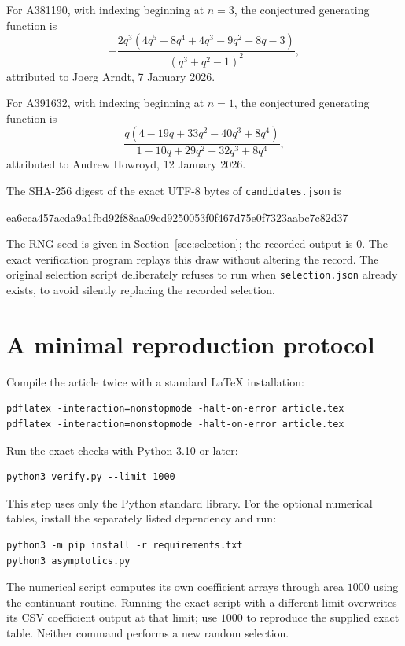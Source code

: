\documentclass[11pt,letterpaper]{article}
\numberwithin{equation}{section}
\theoremstyle{definition}
\begin{document}
For A381190, with indexing beginning at $n=3$, the conjectured generating
function is \cite{oeis381190}
\begin{equation}
 -\frac{2q^3(4q^5+8q^4+4q^3-9q^2-8q-3)}{(q^3+q^2-1)^2},
 \label{eq:candidateDomination}
\end{equation}
attributed to Joerg Arndt, 7 January 2026.

For A391632, with indexing beginning at $n=1$, the conjectured generating
function is \cite{oeis391632}
\begin{equation}
 \frac{q(4-19q+33q^2-40q^3+8q^4)}{1-10q+29q^2-32q^3+8q^4},
 \label{eq:candidateVisibility}
\end{equation}
attributed to Andrew Howroyd, 12 January 2026.

The SHA-256 digest of the exact UTF-8 bytes of \texttt{candidates.json} is
\begin{center}\ttfamily\small
 ea6cca457acda9a1fbd92f88aa09cd9250053f0f467d75e0f7323aabc7c82d37
\end{center}
The RNG seed is given in Section~\ref{sec:selection}; the recorded output
is $0$. The exact verification program replays this draw without altering
the record. The original selection script deliberately refuses to run
when \texttt{selection.json} already exists, to avoid silently replacing
the recorded selection.

\section{A minimal reproduction protocol}
\label{app:reproduce}
Compile the article twice with a standard \LaTeX{} installation:
\begin{verbatim}
pdflatex -interaction=nonstopmode -halt-on-error article.tex
pdflatex -interaction=nonstopmode -halt-on-error article.tex
\end{verbatim}
Run the exact checks with Python 3.10 or later:
\begin{verbatim}
python3 verify.py --limit 1000
\end{verbatim}
This step uses only the Python standard library. For the optional numerical
tables, install the separately listed dependency and run:
\begin{verbatim}
python3 -m pip install -r requirements.txt
python3 asymptotics.py
\end{verbatim}
The numerical script computes its own coefficient arrays through area
$1000$ using the continuant routine. Running the exact script with a
different limit overwrites its CSV coefficient output at that limit; use
$1000$ to reproduce the supplied exact table. Neither command performs a
new random selection.
\end{document}
